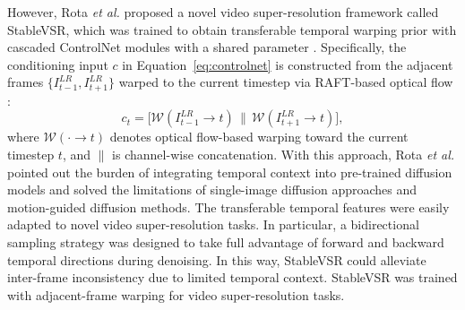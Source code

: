However, Rota \emph{et al.} proposed a novel video 
super-resolution framework called StableVSR, which was trained 
to obtain transferable temporal warping prior with cascaded 
ControlNet modules with a shared parameter 
\cite{rota2024stablevsr}. Specifically, the conditioning input 
$c$ in Equation~\ref{eq:controlnet} is constructed from the 
adjacent frames $\{I^{LR}_{t-1}, I^{LR}_{t+1}\}$ warped to the 
current timestep via RAFT-based optical flow 
\cite{teed2020raft}:
\begin{equation}
    c_t = \big[ \mathcal{W}(I^{LR}_{t-1} \to t) \,\big\|\, 
    \mathcal{W}(I^{LR}_{t+1} \to t) \big],
    \label{eq:stablevsr_cond}
\end{equation}
where $\mathcal{W}(\cdot \to t)$ denotes optical flow-based 
warping toward the current timestep $t$, and $\|$ is 
channel-wise concatenation. With this approach, Rota \emph{et 
al.} pointed out the burden of integrating temporal context 
into pre-trained diffusion models and solved the limitations 
of single-image diffusion approaches and motion-guided 
diffusion methods. The transferable temporal features were 
easily adapted to novel video super-resolution tasks. In 
particular, a bidirectional sampling strategy was designed to 
take full advantage of forward and backward temporal directions 
during denoising. In this way, StableVSR could alleviate 
inter-frame inconsistency due to limited temporal context. 
StableVSR was trained with adjacent-frame warping for video 
super-resolution tasks.